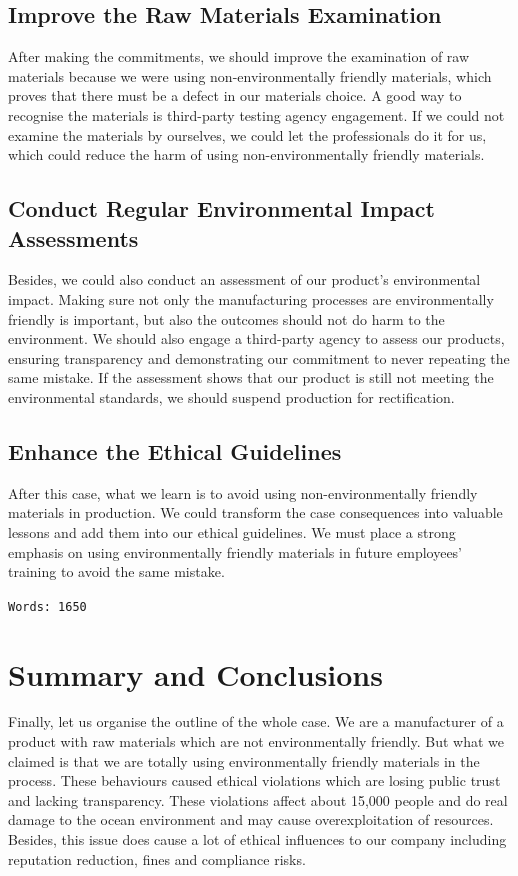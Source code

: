 \documentclass[12pt]{article}
\begin{document}
\subsection{Improve the Raw Materials Examination}

After making the commitments, we should improve the examination of raw materials because we were using non-environmentally friendly materials, which proves that there must be a defect in our materials choice. A good way to recognise the materials is third-party testing agency engagement. If we could not examine the materials by ourselves, we could let the professionals do it for us, which could reduce the harm of using non-environmentally friendly materials.

\subsection{Conduct Regular Environmental Impact Assessments}

Besides, we could also conduct an assessment of our product's environmental impact. Making sure not only the manufacturing processes are environmentally friendly is important, but also the outcomes should not do harm to the environment. We should also engage a third-party agency to assess our products, ensuring transparency and demonstrating our commitment to never repeating the same mistake. If the assessment shows that our product is still not meeting the environmental standards, we should suspend production for rectification.

\subsection{Enhance the Ethical Guidelines}

After this case, what we learn is to avoid using non-environmentally friendly materials in production. We could transform the case consequences into valuable lessons and add them into our ethical guidelines. We must place a strong emphasis on using environmentally friendly materials in future employees' training to avoid the same mistake.

\texttt{Words: 1650}

\section{Summary and Conclusions}

Finally, let us organise the outline of the whole case. We are a manufacturer of a product with raw materials which are not environmentally friendly. But what we claimed is that we are totally using environmentally friendly materials in the process. These behaviours caused ethical violations which are losing public trust and lacking transparency. These violations affect about 15,000 people and do real damage to the ocean environment and may cause overexploitation of resources. Besides, this issue does cause a lot of ethical influences to our company including reputation reduction, fines and compliance risks.
\end{document}
